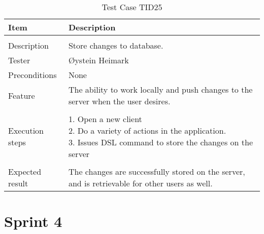 \begin{table}[H]
\caption{Test Case TID25}
\centering
\begin{tabular}{ l p{13cm} }
\hline 
 Item            & Description        \\ 
\hline \\ [-2.0ex]
 Description     &Store changes to database. \\ 
 Tester          & Øystein Heimark                  \\ 
 Preconditions   & None\\ 
 Feature         & The ability to work locally and push changes to the server when the user desires.   \vspace{3pt}                     \\ 
\hline \\ [-1.5ex]
 Execution steps & \pbox{13cm}{1. Open a new client \\ 2. Do a variety of actions in the application. \\ 3. Issues DSL command to store the changes on the server} \vspace{3pt} \\
\hline \\ [-1.5ex]
 Expected result & The changes are successfully stored on the server, and is retrievable for other users as well. \\
\hline 
\end{tabular}
\label{table:testcasetid25}
\end{table}


\section{Sprint 4}
\label{sec:sp4testcases}

